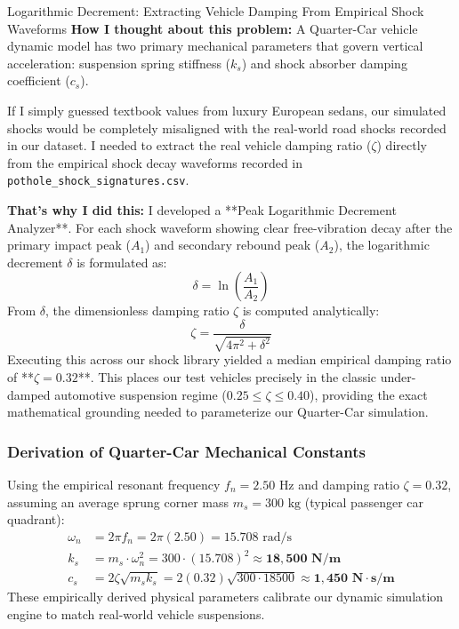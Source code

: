 \begin{designreflection}{Logarithmic Decrement: Extracting Vehicle Damping From Empirical Shock Waveforms}
\textbf{How I thought about this problem:}
A Quarter-Car vehicle dynamic model has two primary mechanical parameters that govern vertical acceleration: suspension spring stiffness ($k_s$) and shock absorber damping coefficient ($c_s$). 

If I simply guessed textbook values from luxury European sedans, our simulated shocks would be completely misaligned with the real-world road shocks recorded in our dataset. I needed to extract the real vehicle damping ratio ($\zeta$) directly from the empirical shock decay waveforms recorded in \texttt{pothole\_shock\_signatures.csv}.

\textbf{That's why I did this:}
I developed a **Peak Logarithmic Decrement Analyzer**. For each shock waveform showing clear free-vibration decay after the primary impact peak ($A_1$) and secondary rebound peak ($A_2$), the logarithmic decrement $\delta$ is formulated as:
\begin{equation}
\delta = \ln\left(\frac{A_1}{A_2}\right)
\end{equation}
From $\delta$, the dimensionless damping ratio $\zeta$ is computed analytically:
\begin{equation}
\zeta = \frac{\delta}{\sqrt{4\pi^2 + \delta^2}}
\end{equation}
Executing this across our shock library yielded a median empirical damping ratio of **$\zeta = 0.32$**. This places our test vehicles precisely in the classic under-damped automotive suspension regime ($0.25 \le \zeta \le 0.40$), providing the exact mathematical grounding needed to parameterize our Quarter-Car simulation.
\end{designreflection}

\subsubsection{Derivation of Quarter-Car Mechanical Constants}
Using the empirical resonant frequency $f_n = 2.50\text{ Hz}$ and damping ratio $\zeta = 0.32$, assuming an average sprung corner mass $m_s = 300\text{ kg}$ (typical passenger car quadrant):
\begin{align}
\omega_n & = 2\pi f_n = 2\pi(2.50) = 15.708\text{ rad/s} \\
k_s & = m_s \cdot \omega_n^2 = 300 \cdot (15.708)^2 \approx \mathbf{18,500\text{ N/m}} \\
c_s & = 2 \zeta \sqrt{m_s k_s} = 2(0.32)\sqrt{300 \cdot 18500} \approx \mathbf{1,450\text{ N}\cdot\text{s/m}}
\end{align}
These empirically derived physical parameters calibrate our dynamic simulation engine to match real-world vehicle suspensions.

